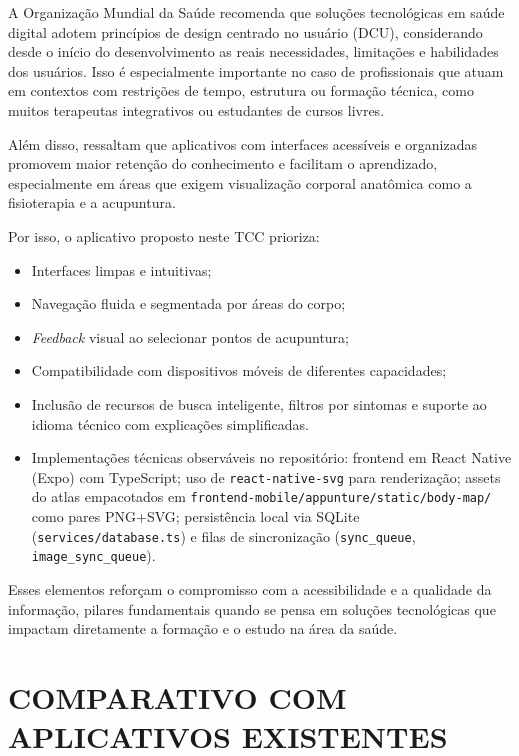 A Organização Mundial da Saúde \cite{oms2020} recomenda que soluções tecnológicas em saúde digital adotem princípios de design centrado no usuário (DCU), considerando desde o início do desenvolvimento as reais necessidades, limitações e habilidades dos usuários. Isso é especialmente importante no caso de profissionais que atuam em contextos com restrições de tempo, estrutura ou formação técnica, como muitos terapeutas integrativos ou estudantes de cursos livres.

Além disso,  ressaltam que aplicativos com interfaces acessíveis e organizadas promovem maior retenção do conhecimento e facilitam o aprendizado, especialmente em áreas que exigem visualização corporal anatômica como a fisioterapia e a acupuntura.

Por isso, o aplicativo proposto neste TCC prioriza:

\begin{itemize}
    \item Interfaces limpas e intuitivas;
    \item Navegação fluida e segmentada por áreas do corpo;
    \item \textit{Feedback} visual ao selecionar pontos de acupuntura;
    \item Compatibilidade com dispositivos móveis de diferentes capacidades;
    \item Inclusão de recursos de busca inteligente, filtros por sintomas e suporte ao idioma técnico com explicações simplificadas.
    \item Implementações técnicas observáveis no repositório: frontend em React Native (Expo) com TypeScript; uso de \texttt{react-native-svg} para renderização; assets do atlas empacotados em \texttt{frontend-mobile/appunture/static/body-map/} como pares PNG+SVG; persistência local via SQLite (\texttt{services/database.ts}) e filas de sincronização (\texttt{sync\_queue}, \texttt{image\_sync\_queue}).
\end{itemize}

Esses elementos reforçam o compromisso com a acessibilidade e a qualidade da informação, pilares fundamentais quando se pensa em soluções tecnológicas que impactam diretamente a formação e o estudo na área da saúde.

\section{COMPARATIVO COM APLICATIVOS EXISTENTES} \label{sec:comparativo}

